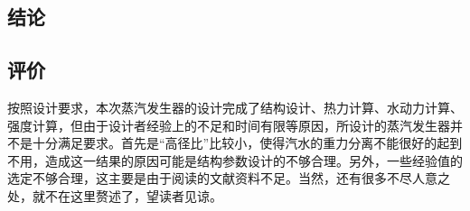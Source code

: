 \subsection{结论}

\subsection{评价}
按照设计要求，本次蒸汽发生器的设计完成了结构设计、热力计算、水动力计算、强度计算，但由于设计者经验上的不足和时间有限等原因，所设计的蒸汽发生器并不是十分满足要求。首先是“高径比”比较小，使得汽水的重力分离不能很好的起到不用，造成这一结果的原因可能是结构参数设计的不够合理。另外，一些经验值的选定不够合理，这主要是由于阅读的文献资料不足。当然，还有很多不尽人意之处，就不在这里赘述了，望读者见谅。
